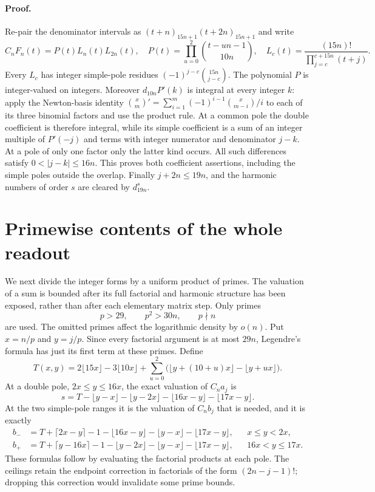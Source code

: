 \documentclass[11pt]{article}
\begin{document}
\paragraph{Proof.}
Re-pair the denominator intervals as
$(t+n)_{15n+1}(t+2n)_{15n+1}$ and write
\[
 C_nF_n(t)=P(t)L_n(t)L_{2n}(t),\quad
 P(t)=\prod_{u=0}^2\binom{t-un-1}{10n},\quad
 L_c(t)=\frac{(15n)!}{\prod_{j=c}^{c+15n}(t+j)}.
\]
Every $L_c$ has integer simple-pole residues
$(-1)^{j-c}\binom{15n}{j-c}$.
The polynomial $P$ is integer-valued on integers.  Moreover
$d_{10n}P'(k)$ is integral at every integer $k$: apply the Newton-basis
identity
$\binom{x}{m}'=\sum_{i=1}^m(-1)^{i-1}\binom{x}{m-i}/i$
to each of its three binomial factors and use the product rule.
At a common pole the double coefficient is therefore integral, while its
simple coefficient is a sum of an integer multiple of $P'(-j)$ and
terms with integer numerator and denominator $j-k$.  At a pole of only one
factor only the latter kind occurs.  All such differences satisfy
$0<|j-k|\le16n$.  This proves both coefficient assertions, including the
simple poles outside the overlap.  Finally $j+2n\le19n$, and the harmonic
numbers of order $s$ are cleared by $d_{19n}^s$.

\section{Primewise contents of the whole readout}
We next divide the integer forms by a uniform product of primes. The
valuation of a sum is bounded after its full factorial and harmonic
structure has been exposed, rather than after each elementary matrix step.
Only primes
\[
 p>29,\qquad p^2>30n,\qquad p\nmid n
 \tag{E}
\]
are used. The omitted primes affect the logarithmic density by $o(n)$.
Put $x=n/p$ and $y=j/p$. Since every factorial argument is at most $29n$,
Legendre's formula has just its first term at these primes.
Define
\[
 T(x,y)=2\lfloor15x\rfloor-3\lfloor10x\rfloor+
 \sum_{u=0}^2\bigl(\lfloor y+(10+u)x\rfloor-\lfloor y+ux\rfloor\bigr).
\]
At a double pole, $2x\le y\le16x$, the exact valuation of $C_na_j$ is
\[
 s=T-\lfloor y-x\rfloor-\lfloor y-2x\rfloor
        -\lfloor16x-y\rfloor-\lfloor17x-y\rfloor.
 \tag{D}
\]
At the two simple-pole ranges it is the valuation of $C_nb_j$ that is
needed, and it is exactly
\begin{align*}
 b_-&=T+\lceil2x-y\rceil-1-\lfloor16x-y\rfloor
                   -\lfloor y-x\rfloor-\lfloor17x-y\rfloor,
           &&x\le y<2x,\\
 b_+&=T+\lceil y-16x\rceil-1-\lfloor y-2x\rfloor
                   -\lfloor y-x\rfloor-\lfloor17x-y\rfloor,
           &&16x<y\le17x.
\end{align*}
These formulas follow by evaluating the factorial products at each pole.
The ceilings retain the endpoint correction in factorials of the form
$(2n-j-1)!$; dropping this correction would invalidate some prime bounds.
\end{document}
